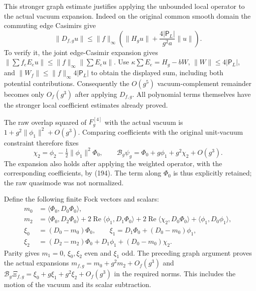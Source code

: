 \documentclass[11pt]{article}
\begin{document}
This stronger graph estimate justifies applying the unbounded local
operator to the actual vacuum expansion. Indeed on the original
common smooth domain the commuting edge Casimirs give
\begin{equation}\label{eq:vertex-weighted-graph-bound}
 \|D_{f,g}u\|\le\|f\|_\infty
           \left(\|H_gu\|+\frac{4|\mathsf P_L|}{g^2a}\|u\|\right).
\end{equation}
To verify it, the joint edge-Casimir expansion gives
$\|\sum f_eE_eu\|\le\|f\|_\infty\|\sum E_eu\|$.
Use $\kappa\sum E_e=H_g-bW$,
$\|W\|\le4|\mathsf P_L|$, and
$\|W_f\|\le\|f\|_\infty4|\mathsf P_L|$ to obtain
the displayed sum, including both potential contributions.
Consequently the $O(g^5)$ vacuum-complement remainder becomes only
$O_f(g^3)$ after applying $D_{f,g}$. All polynomial terms themselves
have the stronger local coefficient estimates already proved.

The raw overlap squared of $F_g^{[4]}$ with the actual vacuum is
$1+g^2\|\phi_1\|^2+O(g^3)$. Comparing coefficients with the
original unit-vacuum constraint therefore fixes
\[
 \chi_2=\phi_2-\tfrac12\|\phi_1\|^2\Phi_0,
 \qquad \mathcal B_g\psi_g
       =\Phi_0+g\phi_1+g^2\chi_2+O(g^3).
\]
The expansion also holds after applying the weighted operator, with
the corresponding coefficients, by
(194). The term along $\Phi_0$
is thus explicitly retained; the raw quasimode was not normalized.

Define the following finite Fock vectors and scalars:
\begin{align}
 m_0&=\langle\Phi_0,D_0\Phi_0\rangle,\nonumber\\
 m_2&=\langle\Phi_0,D_2\Phi_0\rangle
       +2\operatorname{Re}\langle\phi_1,D_1\Phi_0\rangle
       +2\operatorname{Re}\langle\chi_2,D_0\Phi_0\rangle
       +\langle\phi_1,D_0\phi_1\rangle,\nonumber\\
 \xi_0&=(D_0-m_0)\Phi_0,\qquad
 \xi_1=D_1\Phi_0+(D_0-m_0)\phi_1,\nonumber\\
 \xi_2&=(D_2-m_2)\Phi_0+D_1\phi_1+(D_0-m_0)\chi_2.
       \label{eq:vertex-local-state-coefficients}
\end{align}
Parity gives $m_1=0$, $\xi_0,\xi_2$ even and $\xi_1$ odd.
The preceding graph argument proves the actual expansions
$m_{f,g}=m_0+g^2m_2+O_f(g^3)$ and
$\mathcal B_g\Xi_{f,g}=\xi_0+g\xi_1+g^2\xi_2+O_f(g^3)$
in the required norms. This includes the motion of the vacuum and
its scalar subtraction.
\end{document}
